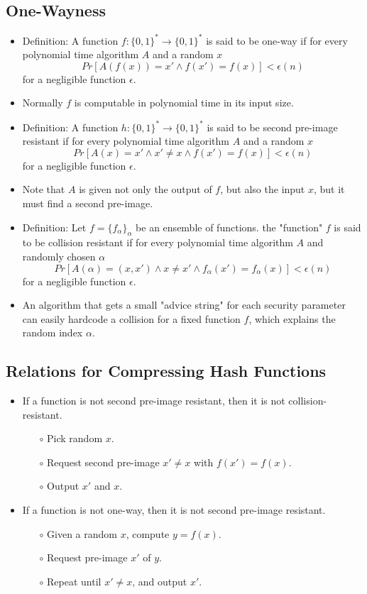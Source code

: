 \documentclass[a4paper]{scrartcl}
\begin{document}
\subsection*{One-Wayness}
\begin{itemize}
\item Definition: A function $f: \{0,1\}^* \rightarrow \{0,1\}^*$ is said to be one-way if for every polynomial time algorithm $A$ and a random $x$ $$Pr[A(f(x)) = x' \land f(x') = f(x)] < \epsilon(n)$$ for a negligible function $\epsilon$.
\item Normally $f$ is computable in polynomial time in its input size.
\item Definition: A function $h: \{0,1\}^* \rightarrow \{0,1\}^*$ is said to be second pre-image resistant if for every polynomial time algorithm $A$ and a random $x$ $$Pr[A(x) = x' \land x' \neq x \land f(x') = f(x)] < \epsilon(n)$$ for a negligible function $\epsilon$.
\item Note that $A$ is given not only the output of $f$, but also the input $x$, but it must find a second pre-image.
\item Definition: Let $f = \{f_\alpha\}_\alpha$ be an ensemble of functions. the "function" $f$ is said to be collision resistant if for every polynomial time algorithm $A$ and randomly chosen $\alpha$ $$Pr[A(\alpha) = (x,x') \land x \neq x' \land f_\alpha(x') = f_\alpha(x)] < \epsilon(n)$$ for a negligible function $\epsilon$.
\item An algorithm that gets a small "advice string" for each security parameter can easily hardcode a collision for a fixed function $f$, which explains the random index $\alpha$.
\end{itemize}

\subsection*{Relations for Compressing Hash Functions}
\begin{itemize}
\item If a function is not second pre-image resistant, then it is not collision-resistant.
\begin{itemize}
\item [$\circ$] Pick random $x$.
\item [$\circ$] Request second pre-image $x' \neq x$ with $f(x') = f(x)$.
\item [$\circ$] Output $x'$ and $x$.
\end{itemize}
\item If a function is not one-way, then it is not second pre-image resistant.
\begin{itemize}
\item [$\circ$] Given a random $x$, compute $y = f(x)$.
\item [$\circ$] Request pre-image $x'$ of $y$.
\item [$\circ$] Repeat until $x' \neq x$, and output $x'$.
\end{itemize}
\end{itemize}
\end{document}

